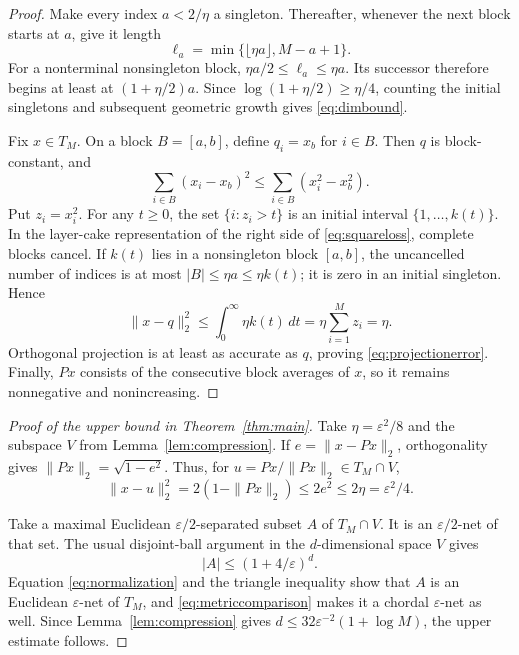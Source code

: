 \documentclass[11pt]{article}
\begin{document}
\begin{proof}
Make every index $a<2/\eta$ a singleton.  Thereafter, whenever the next block
starts at $a$, give it length
\[
 \ell_a=\min\{\lfloor\eta a\rfloor,M-a+1\}.
\]
For a nonterminal nonsingleton block,
$\eta a/2\leq\ell_a\leq\eta a$.  Its successor therefore begins at least at
$(1+\eta/2)a$.  Since
$\log(1+\eta/2)\geq\eta/4$, counting the initial singletons and subsequent
geometric growth gives \eqref{eq:dimbound}.

Fix $x\in T_M$.  On a block $B=[a,b]$, define $q_i=x_b$ for $i\in B$.
Then $q$ is block-constant, and
\begin{equation}\label{eq:squareloss}
 \sum_{i\in B}(x_i-x_b)^2
 \leq\sum_{i\in B}(x_i^2-x_b^2).
\end{equation}
Put $z_i=x_i^2$.  For any $t\geq0$, the set
$\{i:z_i>t\}$ is an initial interval $\{1,\ldots,k(t)\}$.  In the layer-cake
representation of the right side of \eqref{eq:squareloss}, complete blocks
cancel.  If $k(t)$ lies in a nonsingleton block $[a,b]$, the uncancelled number
of indices is at most $|B|\leq\eta a\leq\eta k(t)$; it is zero in an initial
singleton.  Hence
\[
 \|x-q\|_2^2
 \leq \int_0^\infty \eta k(t)\,dt
 =\eta\sum_{i=1}^M z_i=\eta.
\]
Orthogonal projection is at least as accurate as $q$, proving
\eqref{eq:projectionerror}.  Finally, $Px$ consists of the consecutive block
averages of $x$, so it remains nonnegative and nonincreasing.
\end{proof}

\begin{proof}[Proof of the upper bound in Theorem~\ref{thm:main}]
Take $\eta=\varepsilon^2/8$ and the subspace $V$ from
Lemma~\ref{lem:compression}.  If $e=\|x-Px\|_2$, orthogonality gives
$\|Px\|_2=\sqrt{1-e^2}$.  Thus, for
$u=Px/\|Px\|_2\in T_M\cap V$,
\begin{equation}\label{eq:normalization}
 \|x-u\|_2^2
 =2(1-\|Px\|_2)
 \leq2e^2\leq2\eta=\varepsilon^2/4.
\end{equation}

Take a maximal Euclidean $\varepsilon/2$-separated subset $A$ of
$T_M\cap V$.  It is an $\varepsilon/2$-net of that set.  The usual disjoint-ball
argument in the $d$-dimensional space $V$ gives
\[
 |A|\leq(1+4/\varepsilon)^d.
\]
Equation \eqref{eq:normalization} and the triangle inequality show that $A$ is
an Euclidean $\varepsilon$-net of $T_M$, and
\eqref{eq:metriccomparison} makes it a chordal $\varepsilon$-net as well.
Since Lemma~\ref{lem:compression} gives
$d\leq32\varepsilon^{-2}(1+\log M)$, the upper estimate follows.
\end{proof}
\end{document}
